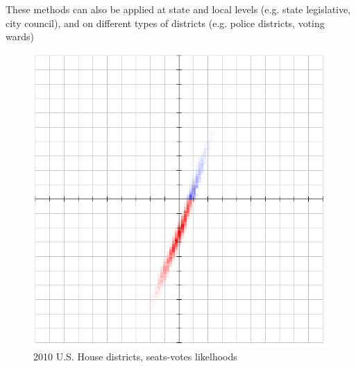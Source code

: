 \documentclass[preprint,12pt]{article}
\begin{document}
These methods can also be applied at state and local levels (e.g. state legislative, city council), and on different types of districts (e.g. police districts, voting wards)

\begin{figure}[htb!]
    \begin{center}
        \includegraphics[scale=0.5]{Figures/original_method/2010_ush.png}
        \caption{2010 U.S. House districts, seats-votes likelhoods}\label{fig:2010_ush}
    \end{center}
\end{figure}
\end{document}
